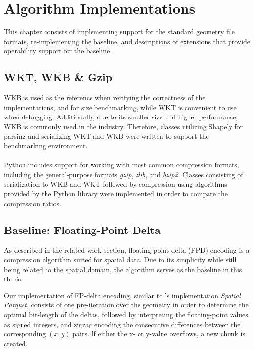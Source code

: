 \chapter{Algorithm Implementations}
\label{sec:chapterimplementation}
This chapter consists of implementing support for the standard geometry file formats, re-implementing the baseline, and descriptions of extensions that provide operability support for the baseline.

\section{WKT, WKB \& Gzip}
WKB is used as the reference when verifying the correctness of the implementations, and for size benchmarking, while WKT is convenient to use when debugging. Additionally, due to its smaller size and higher performance, WKB is commonly used in the industry. Therefore, classes utilizing Shapely for parsing and serializing WKT and WKB were written to support the benchmarking environment.
\\\\
Python includes support for working with most common compression formats, including the general-purpose formats \emph{gzip}, \emph{zlib}, and \emph{bzip2}. Classes consisting of serialization to WKB and WKT followed by compression using algorithms provided by the Python library were implemented in order to compare the compression ratios.


\section{Baseline: Floating-Point Delta}
\label{section:baseline}
As described in the related work section, floating-point delta (FPD) encoding is a compression algorithm suited for spatial data. Due to its simplicity while still being related to the spatial domain, the algorithm \cite{spatialparquet} serves as the baseline in this thesis.

Our implementation of FP-delta encoding, similar to \citeauthor{spatialparquet}'s implementation \emph{Spatial Parquet}, consists of one pre-iteration over the geometry in order to determine the optimal bit-length of the deltas, followed by interpreting the floating-point values as signed integers, and zigzag encoding the consecutive differences between the corresponding $(x, y)$ pairs. If either the x- or y-value overflows, a new chunk is created.

